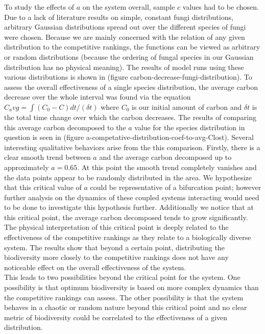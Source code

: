\documentclass[10pt]{article}
\begin{document}
To study the effects of $a$ on the system overall, sample $c$ values had to be chosen. Due to a lack of literature results on simple, constant fungi distributions, arbitrary Gaussian distributions spread out over the different species of fungi were chosen. Because we are mainly concerned with the relation of any given distribution to the competitive rankings, the functions can be viewed as arbitrary or random distributions (because the ordering of fungal species in our Gaussian distribution has no physical meaning). The results of model runs using these various distributions is shown in (figure carbon-decrease-fungi-distribution). To assess the overall effectiveness of a single species distribution, the average carbon decrease over the whole interval was found via the equation $C_avg = \int (C_{0}-C)dt/(\delta t)$ where $C_{0}$ is our initial amount of carbon and $\delta t$ is the total time change over which the carbon decreases. The results of comparing this average carbon decomposed to the $a$ value for the species distribution in question is seen in (figure a-competative-distribution-coef-to-avg-Clost). Several interesting qualitative behaviors arise from the this comparison. Firstly, there is a clear smooth trend between $a$ and the average carbon decomposed up to approximately $a=0.65$. At this point the smooth trend completely vanishes and the data points appear to be randomly distributed in the area. We hypothesize that this critical value of $a$ could be representative of a bifurcation point; however further analysis on the dynamics of these coupled systems interacting would need to be done to investigate this hypothesis further. Additionally we notice that at this critical point, the average carbon decomposed tends to grow significantly. The physical interpretation of this critical point is deeply related to the effectiveness of the competitive rankings as they relate to a biologically diverse system. The results show that beyond a certain point, distributing the biodiversity more closely to the competitive rankings does not have any noticeable effect on the overall effectiveness of the system. \\
This leads to two possibilities beyond the critical point for the system. One possibility is that optimum biodiversity is based on more complex dynamics than the competitive rankings can assess. The other possibility is that the system behaves in a chaotic or random nature beyond this critical point and no clear metric of biodiversity could be correlated to the effectiveness of a given distribution.
\end{document}
